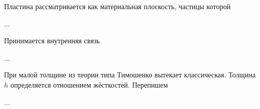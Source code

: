 \begin{otherlanguage}{russian}

Пластина рассматривается как материальная плоскость, частицы которой

...



\end{otherlanguage}



\begin{otherlanguage}{russian}

Принимается внутренняя связь

...



\end{otherlanguage}



\begin{otherlanguage}{russian}

При малой толщине из теории типа Тимошенко вытекает классическая. Толщина~$h$ определяется отношением жёсткостей. Перепишем

...



\end{otherlanguage}



